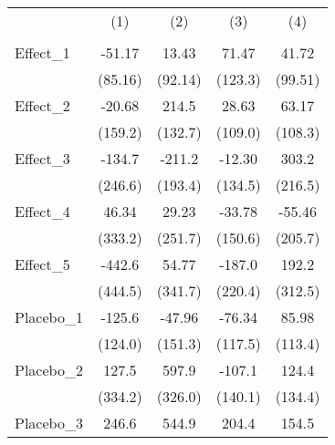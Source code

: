 {
\def\sym#1{\ifmmode^{#1}\else\(^{#1}\)\fi}
\begin{tabular}{l*{4}{c}}
\toprule
            &\multicolumn{1}{c}{(1)}&\multicolumn{1}{c}{(2)}&\multicolumn{1}{c}{(3)}&\multicolumn{1}{c}{(4)}\\
            &\multicolumn{1}{c}{} &\multicolumn{1}{c}{} &\multicolumn{1}{c}{} &\multicolumn{1}{c}{} \\
\midrule
Effect\_1    &      -51.17         &       13.43         &       71.47         &       41.72         \\
            &     (85.16)         &     (92.14)         &     (123.3)         &     (99.51)         \\
\addlinespace
Effect\_2    &      -20.68         &       214.5         &       28.63         &       63.17         \\
            &     (159.2)         &     (132.7)         &     (109.0)         &     (108.3)         \\
\addlinespace
Effect\_3    &      -134.7         &      -211.2         &      -12.30         &       303.2         \\
            &     (246.6)         &     (193.4)         &     (134.5)         &     (216.5)         \\
\addlinespace
Effect\_4    &       46.34         &       29.23         &      -33.78         &      -55.46         \\
            &     (333.2)         &     (251.7)         &     (150.6)         &     (205.7)         \\
\addlinespace
Effect\_5    &      -442.6         &       54.77         &      -187.0         &       192.2         \\
            &     (444.5)         &     (341.7)         &     (220.4)         &     (312.5)         \\
\addlinespace
Placebo\_1   &      -125.6         &      -47.96         &      -76.34         &       85.98         \\
            &     (124.0)         &     (151.3)         &     (117.5)         &     (113.4)         \\
\addlinespace
Placebo\_2   &       127.5         &       597.9         &      -107.1         &       124.4         \\
            &     (334.2)         &     (326.0)         &     (140.1)         &     (134.4)         \\
\addlinespace
Placebo\_3   &       246.6         &       544.9         &       204.4         &       154.5         \\

\end{tabular}}
